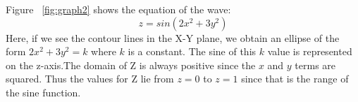 \documentclass{article}
\begin{document}
\begin{figure}[!ht]
\centering
{}
\label{fig:graphs}
\end{figure}


Figure ~\ref{fig:graph2} shows the equation of the wave:\begin{equation}z = sin(2x^2+3y^2)\end{equation}
Here, if we see the contour lines in the X-Y plane, we obtain an ellipse of the form $2x^2+3y^2=k$ where $k$ is a constant. The sine of this $k$ value is represented on the z-axis.The domain of Z is always positive since the $x$ and $y$ terms are squared. Thus the values for Z lie from $z=0$ to $z=1$ since that is the range of the sine function.
\end{document}
